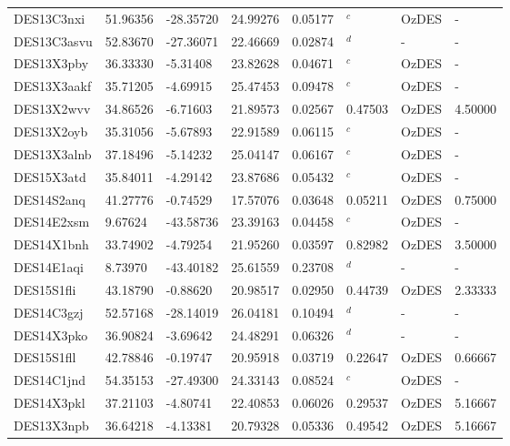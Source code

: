 \documentclass[fleqn,usenatbib,]{mnras}
\begin{document}
\begin{table}
\begin{threeparttable}
\begin{tabular}{llllllll}
DES13C3nxi     & 51.96356 & -28.35720 & 24.99276 & 0.05177 &    $^c$ &      OzDES &             - \\
DES13C3asvu    & 52.83670 & -27.36071 & 22.46669 & 0.02874 &    $^d$ &          - &             - \\
DES13X3pby     & 36.33330 &  -5.31408 & 23.82628 & 0.04671 &    $^c$ &      OzDES &             - \\
DES13X3aakf    & 35.71205 &  -4.69915 & 25.47453 & 0.09478 &    $^c$ &      OzDES &             - \\
DES13X2wvv     & 34.86526 &  -6.71603 & 21.89573 & 0.02567 & 0.47503 &      OzDES &       4.50000 \\
DES13X2oyb     & 35.31056 &  -5.67893 & 22.91589 & 0.06115 &    $^c$ &      OzDES &             - \\
DES13X3alnb    & 37.18496 &  -5.14232 & 25.04147 & 0.06167 &    $^c$ &      OzDES &             - \\
DES15X3atd     & 35.84011 &  -4.29142 & 23.87686 & 0.05432 &    $^c$ &      OzDES &             - \\
DES14S2anq     & 41.27776 &  -0.74529 & 17.57076 & 0.03648 & 0.05211 &      OzDES &       0.75000 \\
DES14E2xsm     &  9.67624 & -43.58736 & 23.39163 & 0.04458 &    $^c$ &      OzDES &             - \\
DES14X1bnh     & 33.74902 &  -4.79254 & 21.95260 & 0.03597 & 0.82982 &      OzDES &       3.50000 \\
DES14E1aqi     &  8.73970 & -43.40182 & 25.61559 & 0.23708 &    $^d$ &          - &             - \\
DES15S1fli     & 43.18790 &  -0.88620 & 20.98517 & 0.02950 & 0.44739 &      OzDES &       2.33333 \\
DES14C3gzj     & 52.57168 & -28.14019 & 26.04181 & 0.10494 &    $^d$ &          - &             - \\
DES14X3pko     & 36.90824 &  -3.69642 & 24.48291 & 0.06326 &    $^d$ &          - &             - \\
DES15S1fll     & 42.78846 &  -0.19747 & 20.95918 & 0.03719 & 0.22647 &      OzDES &       0.66667 \\
DES14C1jnd     & 54.35153 & -27.49300 & 24.33143 & 0.08524 &    $^c$ &      OzDES &             - \\
DES14X3pkl     & 37.21103 &  -4.80741 & 22.40853 & 0.06026 & 0.29537 &      OzDES &       5.16667 \\
DES13X3npb     & 36.64218 &  -4.13381 & 20.79328 & 0.05336 & 0.49542 &      OzDES &       5.16667 \\

\end{tabular}
\end{threeparttable}
\end{table}
\end{document}
